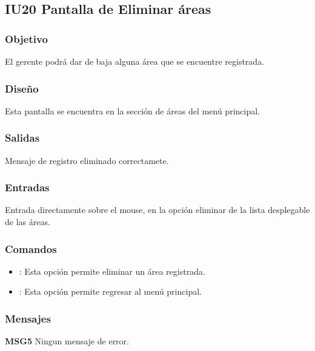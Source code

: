 \subsection{IU20 Pantalla de Eliminar áreas}

\subsubsection{Objetivo}
	El gerente podrá dar de baja alguna área que se encuentre registrada.

\subsubsection{Diseño}
	Esta pantalla se encuentra en la sección de áreas del menú principal.


\subsubsection{Salidas}

	Mensaje de registro eliminado correctamete.

\subsubsection{Entradas}
Entrada directamente sobre el mouse, en la opción eliminar de la lista desplegable de las áreas.

\subsubsection{Comandos}
\begin{itemize}
	\item {}: Esta opción permite eliminar un área registrada.
	\item {}: Esta opción permite regresar al menú principal.
\end{itemize}

\subsubsection{Mensajes}
	\begin{Citemize}
		\item {\bf MSG5} Ningun mensaje de error.
	\end{Citemize}

